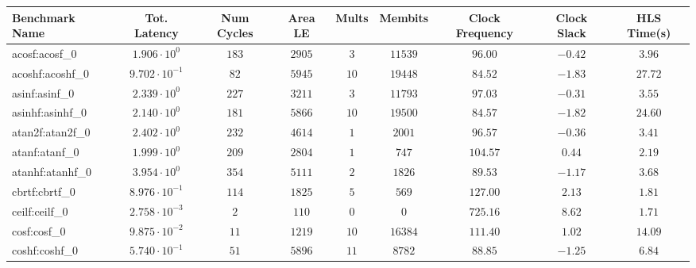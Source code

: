 \begin{tabular}{|l|c|c|c|c|c|c|c|c|}
\hline
Benchmark Name               & Tot. Latency            & Num Cycles & Area LE   & Mults   & Membits    & Clock Frequency & Clock Slack & HLS Time(s) \\
\hline
acosf:acosf\_0               & $ 1.906 \cdot 10^{0}  $ & $ 183    $ & $ 2905  $ & $ 3   $ & $ 11539  $ & $ 96.00       $ & $ -0.42   $ & $ 3.96    $ \\
acoshf:acoshf\_0             & $ 9.702 \cdot 10^{-1} $ & $ 82     $ & $ 5945  $ & $ 10  $ & $ 19448  $ & $ 84.52       $ & $ -1.83   $ & $ 27.72   $ \\
asinf:asinf\_0               & $ 2.339 \cdot 10^{0}  $ & $ 227    $ & $ 3211  $ & $ 3   $ & $ 11793  $ & $ 97.03       $ & $ -0.31   $ & $ 3.55    $ \\
asinhf:asinhf\_0             & $ 2.140 \cdot 10^{0}  $ & $ 181    $ & $ 5866  $ & $ 10  $ & $ 19500  $ & $ 84.57       $ & $ -1.82   $ & $ 24.60   $ \\
atan2f:atan2f\_0             & $ 2.402 \cdot 10^{0}  $ & $ 232    $ & $ 4614  $ & $ 1   $ & $ 2001   $ & $ 96.57       $ & $ -0.36   $ & $ 3.41    $ \\
atanf:atanf\_0               & $ 1.999 \cdot 10^{0}  $ & $ 209    $ & $ 2804  $ & $ 1   $ & $ 747    $ & $ 104.57      $ & $ 0.44    $ & $ 2.19    $ \\
atanhf:atanhf\_0             & $ 3.954 \cdot 10^{0}  $ & $ 354    $ & $ 5111  $ & $ 2   $ & $ 1826   $ & $ 89.53       $ & $ -1.17   $ & $ 3.68    $ \\
cbrtf:cbrtf\_0               & $ 8.976 \cdot 10^{-1} $ & $ 114    $ & $ 1825  $ & $ 5   $ & $ 569    $ & $ 127.00      $ & $ 2.13    $ & $ 1.81    $ \\
ceilf:ceilf\_0               & $ 2.758 \cdot 10^{-3} $ & $ 2      $ & $ 110   $ & $ 0   $ & $ 0      $ & $ 725.16      $ & $ 8.62    $ & $ 1.71    $ \\
cosf:cosf\_0                 & $ 9.875 \cdot 10^{-2} $ & $ 11     $ & $ 1219  $ & $ 10  $ & $ 16384  $ & $ 111.40      $ & $ 1.02    $ & $ 14.09   $ \\
coshf:coshf\_0               & $ 5.740 \cdot 10^{-1} $ & $ 51     $ & $ 5896  $ & $ 11  $ & $ 8782   $ & $ 88.85       $ & $ -1.25   $ & $ 6.84    $ \\

\end{tabular}
